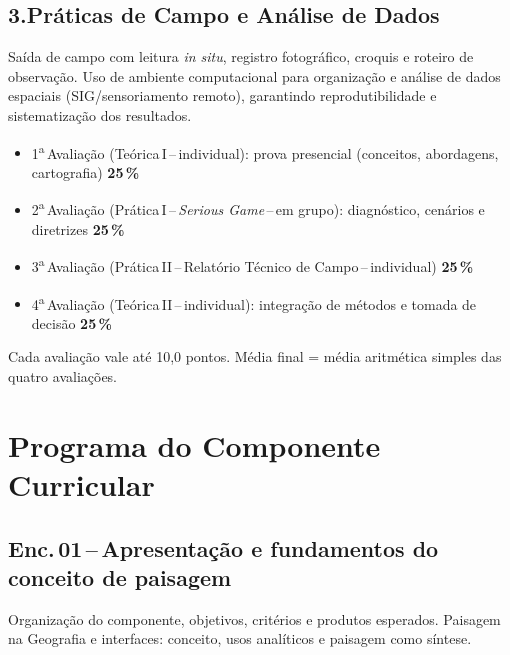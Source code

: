 \documentclass[11pt,a4paper]{article}
\begin{document}
\subsection*{3.\enspace Práticas de Campo e Análise de Dados}
Saída de campo com leitura \textit{in situ}, registro fotográfico, croquis e roteiro de observação. Uso de ambiente computacional para organização e análise de dados espaciais (SIG/sensoriamento remoto), garantindo reprodutibilidade e sistematização dos resultados.

\begin{tcolorbox}[uefsbox, colframe=uefsaccent, colback=white, title={\bfseries\color{white}\scshape Avaliação}, fonttitle=\normalsize, coltitle=white, colbacktitle=uefsaccent, attach boxed title to top left={yshift=-2mm,xshift=2mm}, boxed title style={arc=2pt,boxrule=0pt}]
\begin{itemize}[leftmargin=1.2em]
\item 1\textsuperscript{a}\,Avaliação (Teórica\,I\,--\,individual): prova presencial (conceitos, abordagens, cartografia)\,\dotfill\,\textbf{25\,\%}
\item 2\textsuperscript{a}\,Avaliação (Prática\,I\,--\,\textit{Serious Game}\,--\,em grupo): diagnóstico, cenários e diretrizes\,\dotfill\,\textbf{25\,\%}
\item 3\textsuperscript{a}\,Avaliação (Prática\,II\,--\,Relatório Técnico de Campo\,--\,individual)\,\dotfill\,\textbf{25\,\%}
\item 4\textsuperscript{a}\,Avaliação (Teórica\,II\,--\,individual): integração de métodos e tomada de decisão\,\dotfill\,\textbf{25\,\%}
\end{itemize}
\vspace{4pt}
{\footnotesize Cada avaliação vale até 10,0 pontos. Média final = média aritmética simples das quatro avaliações.}
\end{tcolorbox}

\section*{Programa do Componente Curricular}

\subsection*{Enc.\,01\,--\,Apresentação e fundamentos do conceito de paisagem}
Organização do componente, objetivos, critérios e produtos esperados. Paisagem na Geografia e interfaces: conceito, usos analíticos e paisagem como síntese.
\end{document}
